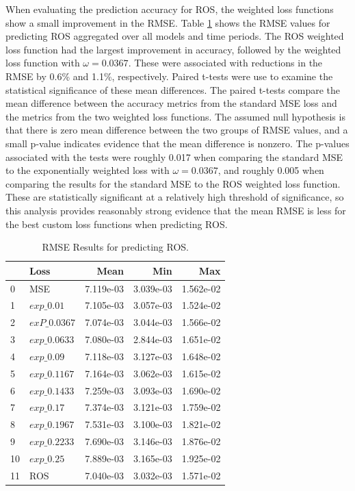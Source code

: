 \documentclass[11pt]{article}%
\begin{document}
When evaluating the prediction accuracy for ROS, the weighted loss functions show a small improvement in the RMSE. Table \ref{tab:ros_results} shows the RMSE values for predicting ROS aggregated over all models and time periods. The ROS weighted loss function had the largest improvement in accuracy, followed by the weighted loss function with $\omega=0.0367$. These were associated with reductions in the RMSE by 0.6\% and 1.1\%, respectively. Paired t-tests were use to examine the statistical significance of these mean differences. The paired t-tests compare the mean difference between the accuracy metrics from the standard MSE loss and the metrics from the two weighted loss functions. The assumed null hypothesis is that there is zero mean difference between the two groups of RMSE values, and a small p-value indicates evidence that the mean difference is nonzero. The p-values associated with the tests were roughly 0.017 when comparing the standard MSE to the exponentially weighted loss with $\omega=0.0367$, and roughly 0.005 when comparing the results for the standard MSE to the ROS weighted loss function. These are statistically significant at a relatively high threshold of significance, so this analysis provides reasonably strong evidence that the mean RMSE is less for the best custom loss functions when predicting ROS.

\begin{table}[ht]
\centering
\caption{RMSE Results for predicting ROS.}
\label{tab:ros_results}
\begin{tabular}{llrrr}
\toprule
 & Loss & Mean & Min & Max \\
\midrule
0 & MSE & 7.119e-03 & 3.039e-03 & 1.562e-02 \\
1 & $exp\_0.01$ & 7.105e-03 & 3.057e-03 & 1.524e-02 \\
2 & $exP\_0.0367$ & 7.074e-03 & 3.044e-03 & 1.566e-02 \\
3 & $exp\_0.0633$ & 7.080e-03 & 2.844e-03 & 1.651e-02 \\
4 & $exp\_0.09$ & 7.118e-03 & 3.127e-03 & 1.648e-02 \\
5 & $exp\_0.1167$ & 7.164e-03 & 3.062e-03 & 1.615e-02 \\
6 & $exp\_0.1433$ & 7.259e-03 & 3.093e-03 & 1.690e-02 \\
7 & $exp\_0.17$ & 7.374e-03 & 3.121e-03 & 1.759e-02 \\
8 & $exp\_0.1967$ & 7.531e-03 & 3.100e-03 & 1.821e-02 \\
9 & $exp\_0.2233$ & 7.690e-03 & 3.146e-03 & 1.876e-02 \\
10 & $exp\_0.25$ & 7.889e-03 & 3.165e-03 & 1.925e-02 \\
11 & ROS & 7.040e-03 & 3.032e-03 & 1.571e-02 \\
\bottomrule
\end{tabular}
\end{table}
\end{document}
